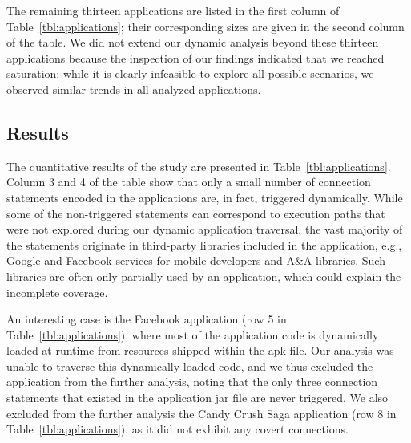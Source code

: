 The remaining thirteen applications are listed in the first column of Table~\ref{tbl:applications}; their corresponding sizes are given in the second column of the table. 
We did not extend our dynamic analysis beyond these thirteen applications because the inspection of our findings indicated that we reached saturation: while it is clearly infeasible to explore all possible scenarios, we observed similar trends in all analyzed applications. 

\subsection{Results}
The quantitative results of the study are presented in %
Table~\ref{tbl:applications}. 
Column 3 and 4 of the table show that only a small number of connection statements encoded in the applications are, in fact, triggered dynamically. 
While some of the non-triggered statements can correspond to execution paths that were not explored during our dynamic application traversal, the vast majority of the statements originate in  
third-party libraries included in the application, e.g., Google and Facebook services for mobile developers and A\&A libraries. 
Such libraries are often only partially used by an application, which could explain the incomplete coverage.  

An interesting case is the Facebook application (row 5 in Table~\ref{tbl:applications}), where most of the application code is dynamically loaded at runtime from resources shipped within the apk file. 
Our analysis was unable to traverse this dynamically loaded code, and we thus excluded the application from the further analysis, noting that the only three connection statements that existed in the application jar file are never triggered. We also excluded from the further analysis the Candy Crush Saga application (row 8 in Table~\ref{tbl:applications}), as it did not exhibit any covert connections.

